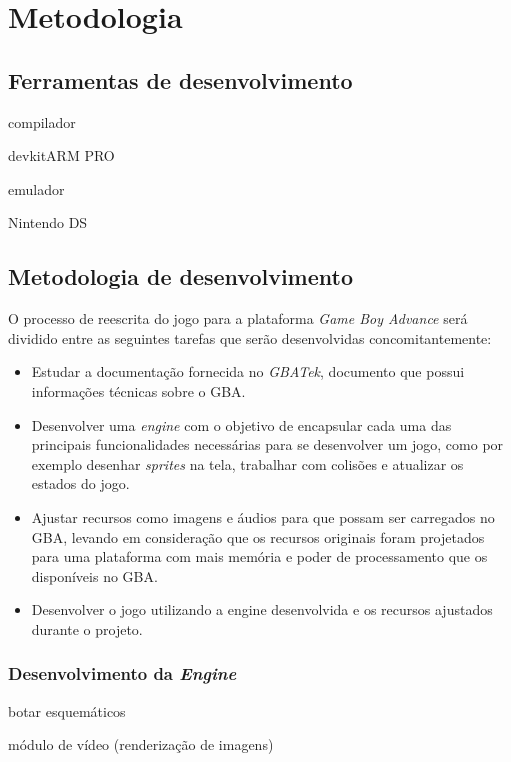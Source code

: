 \chapter[Metodologia]{Metodologia}

\section{Ferramentas de desenvolvimento}

compilador

devkitARM PRO

emulador

Nintendo DS

\section{Metodologia de desenvolvimento}

O processo de reescrita do jogo para a plataforma \textit{Game Boy Advance} será dividido entre as seguintes tarefas que serão desenvolvidas concomitantemente:

\begin{itemize}
\item Estudar a documentação fornecida no \textit{GBATek}, documento que possui informações técnicas sobre o GBA.

\item Desenvolver uma \textit{engine} com o objetivo de encapsular cada uma das principais funcionalidades necessárias para se desenvolver um jogo, como por exemplo desenhar \textit{sprites} na tela, trabalhar com colisões e atualizar os estados do jogo.

\item Ajustar recursos como imagens e áudios para que possam ser carregados no GBA, levando em consideração que os recursos originais foram projetados para uma plataforma com mais memória e poder de processamento que os disponíveis no GBA.

\item Desenvolver o jogo utilizando a engine desenvolvida e os recursos ajustados durante o projeto.
\end{itemize}

\subsection{Desenvolvimento da \textit{Engine}}

botar esquemáticos

módulo de vídeo (renderização de imagens)

